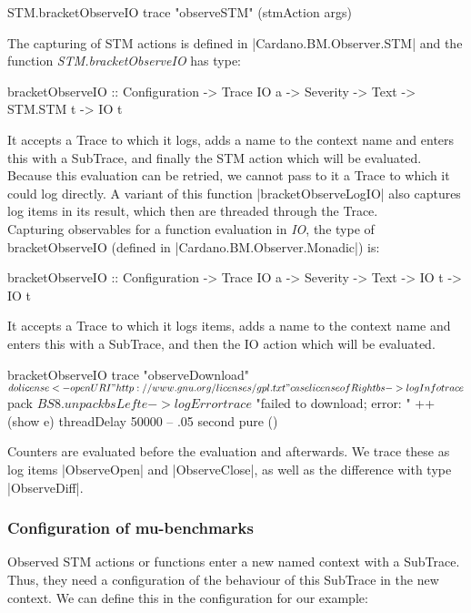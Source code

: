 \begin{spec}
    STM.bracketObserveIO trace "observeSTM" (stmAction args)
\end{spec}

The capturing of STM actions is defined in |Cardano.BM.Observer.STM| and the
function \emph{STM.bracketObserveIO} has type:
\begin{spec}
    bracketObserveIO
        :: Configuration
        -> Trace IO a
        -> Severity
        -> Text
        -> STM.STM t
        -> IO t
\end{spec}
It accepts a Trace to which it logs, adds a name to the context name and enters
this with a SubTrace, and finally the STM action which will be evaluated.
Because this evaluation can be retried, we cannot pass to it a Trace to which it
could log directly. A variant of this function |bracketObserveLogIO| also
captures log items in its result, which then are threaded through the Trace.
\\
Capturing observables for a function evaluation in \emph{IO}, the type of
\mbox{bracketObserveIO} (defined in |Cardano.BM.Observer.Monadic|) is:
\begin{spec}
    bracketObserveIO
        :: Configuration
        -> Trace IO a
        -> Severity
        -> Text
        -> IO t
        -> IO t
\end{spec}

It accepts a Trace to which it logs items, adds a name to the context name and
enters this with a SubTrace, and then the IO action which will be evaluated.

\begin{spec}
    bracketObserveIO trace "observeDownload" $ do
        license <- openURI "http://www.gnu.org/licenses/gpl.txt"
        case license of
            Right bs -> logInfo trace $ pack $ BS8.unpack bs
            Left e   -> logError trace $ "failed to download; error: " ++ (show e)
        threadDelay 50000  -- .05 second
        pure ()
\end{spec}

Counters are evaluated before the evaluation and afterwards. We trace these as
log items |ObserveOpen| and |ObserveClose|, as well as the difference
with type |ObserveDiff|.

\subsubsection{Configuration of mu-benchmarks}

Observed STM actions or functions enter a new named context with a SubTrace.
Thus, they need a configuration of the behaviour of this SubTrace in the new
context. We can define this in the configuration for our example:

